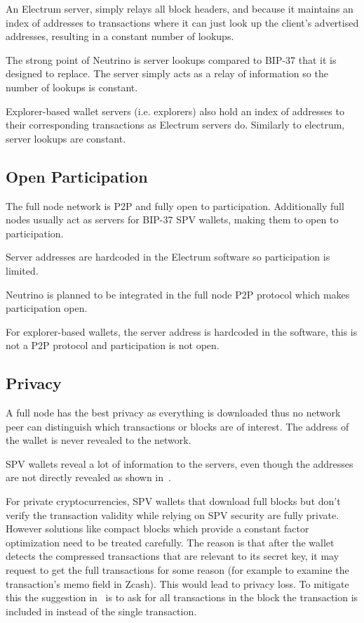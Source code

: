 An Electrum server, simply relays all block headers, and because it maintains an index of addresses to transactions where it can just look up the client's advertised addresses, resulting in a constant number of lookups.

The strong point of Neutrino is server lookups compared to BIP-37 that it is designed to replace. The server simply acts as a relay of information so the number of lookups is constant.

Explorer-based wallet servers (i.e. explorers) also hold an index of addresses to their corresponding transactions as Electrum servers do. Similarly to electrum, server lookups are constant.

\subsection{Open Participation}
The full node network is P2P and fully open to participation.  Additionally full nodes usually act as servers for BIP-37 SPV wallets, making them to open to participation.

Server addresses are hardcoded in the Electrum software so participation is limited.

Neutrino is planned to be integrated in the full node P2P protocol which makes participation open.

For explorer-based wallets, the server address is hardcoded in the software, this is not a P2P protocol and participation is not open.

\subsection{Privacy}
A full node has the best privacy as everything is downloaded thus no network peer can distinguish which transactions or blocks are of interest. The address of the wallet is never revealed to the network. 

SPV wallets reveal a lot of information to the servers, even though the addresses are not directly revealed as shown in~\cite{gervais2014privacy}.

For private cryptocurrencies, SPV wallets that download full blocks but don't verify the transaction validity while relying on SPV security are fully private. However solutions like compact blocks which provide a constant factor optimization need to be treated carefully. The reason is that after the wallet detects the compressed transactions that are relevant to its secret key, it may request to get the full transactions for some reason (for example to examine the transaction's memo field in Zcash). This would lead to privacy loss. To mitigate this the suggestion in~\cite{compact-blocks} is to ask for all transactions in the block the transaction is included in instead of the single transaction.

